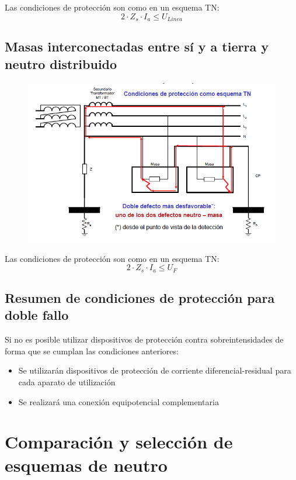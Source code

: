 Las condiciones de protección son como en un esquema TN:
\begin{equation}
	2\cdot Z_s\cdot I_{a} \le U_{Linea}
\end{equation}
\subsection{Masas interconectadas entre sí y a tierra y neutro distribuido}
\begin{figure}[H]
	\centering
	\includegraphics[width=0.5\linewidth]{Images/41}
	\label{fig:41}
\end{figure}
Las condiciones de protección son como en un esquema TN:
\begin{equation}
	2\cdot Z_s\cdot I_{a} \le U_{F}
\end{equation}
\subsection{Resumen de condiciones de protección para doble fallo}
Si no es posible utilizar dispositivos de protección contra
sobreintensidades de forma que se cumplan las condiciones anteriores:
\begin{itemize}
	\item Se utilizarán dispositivos de protección de corriente
	diferencial-residual para cada aparato de utilización
	\item Se realizará una conexión equipotencial complementaria
\end{itemize}
\section{Comparación y selección de esquemas de neutro}

